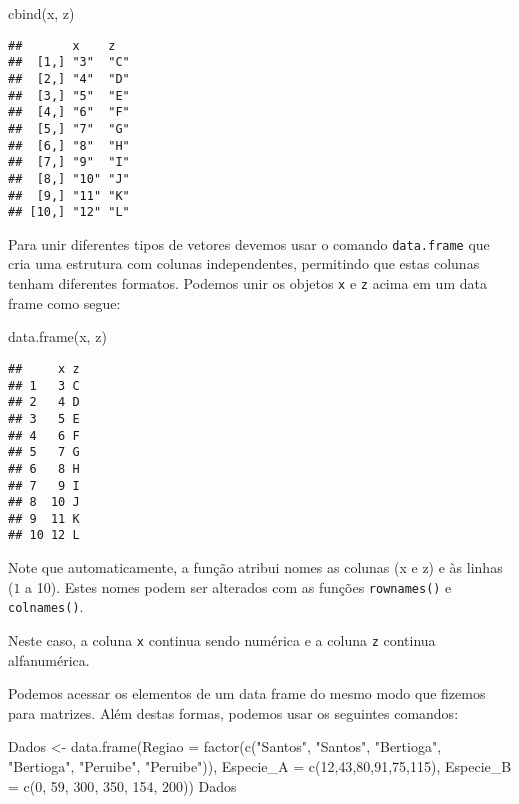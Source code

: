 \documentclass[
]{book}
\newenvironment{Shaded}{\begin{snugshade}}{\end{snugshade}}
\newcommand{\AttributeTok}[1]{\textcolor[rgb]{0.77,0.63,0.00}{#1}}
\newcommand{\DecValTok}[1]{\textcolor[rgb]{0.00,0.00,0.81}{#1}}
\newcommand{\FunctionTok}[1]{\textcolor[rgb]{0.00,0.00,0.00}{#1}}
\newcommand{\NormalTok}[1]{#1}
\newcommand{\OtherTok}[1]{\textcolor[rgb]{0.56,0.35,0.01}{#1}}
\newcommand{\StringTok}[1]{\textcolor[rgb]{0.31,0.60,0.02}{#1}}
\begin{document}
\begin{Shaded}
\begin{Highlighting}[]
\FunctionTok{cbind}\NormalTok{(x, z)}
\end{Highlighting}
\end{Shaded}

\begin{verbatim}
##       x    z  
##  [1,] "3"  "C"
##  [2,] "4"  "D"
##  [3,] "5"  "E"
##  [4,] "6"  "F"
##  [5,] "7"  "G"
##  [6,] "8"  "H"
##  [7,] "9"  "I"
##  [8,] "10" "J"
##  [9,] "11" "K"
## [10,] "12" "L"
\end{verbatim}

Para unir diferentes tipos de vetores devemos usar o comando \texttt{data.frame} que cria uma estrutura com colunas independentes, permitindo que estas colunas tenham diferentes formatos. Podemos unir os objetos \texttt{x} e \texttt{z} acima em um data frame como segue:

\begin{Shaded}
\begin{Highlighting}[]
\FunctionTok{data.frame}\NormalTok{(x, z)}
\end{Highlighting}
\end{Shaded}

\begin{verbatim}
##     x z
## 1   3 C
## 2   4 D
## 3   5 E
## 4   6 F
## 5   7 G
## 6   8 H
## 7   9 I
## 8  10 J
## 9  11 K
## 10 12 L
\end{verbatim}

Note que automaticamente, a função atribui nomes as colunas (x e z) e às linhas (\(1\) a 10). Estes nomes podem ser alterados com as funções \texttt{rownames()} e \texttt{colnames()}.

Neste caso, a coluna \texttt{x} continua sendo numérica e a coluna \texttt{z} continua alfanumérica.

Podemos acessar os elementos de um data frame do mesmo modo que fizemos para matrizes. Além destas formas, podemos usar os seguintes comandos:

\begin{Shaded}
\begin{Highlighting}[]
\NormalTok{Dados }\OtherTok{\textless{}{-}} \FunctionTok{data.frame}\NormalTok{(}\AttributeTok{Regiao =} \FunctionTok{factor}\NormalTok{(}\FunctionTok{c}\NormalTok{(}\StringTok{"Santos"}\NormalTok{, }\StringTok{"Santos"}\NormalTok{, }
                                     \StringTok{"Bertioga"}\NormalTok{, }\StringTok{"Bertioga"}\NormalTok{, }
                                     \StringTok{"Peruibe"}\NormalTok{, }\StringTok{"Peruibe"}\NormalTok{)),}
                   \AttributeTok{Especie\_A =} \FunctionTok{c}\NormalTok{(}\DecValTok{12}\NormalTok{,}\DecValTok{43}\NormalTok{,}\DecValTok{80}\NormalTok{,}\DecValTok{91}\NormalTok{,}\DecValTok{75}\NormalTok{,}\DecValTok{115}\NormalTok{), }
                   \AttributeTok{Especie\_B =} \FunctionTok{c}\NormalTok{(}\DecValTok{0}\NormalTok{, }\DecValTok{59}\NormalTok{, }\DecValTok{300}\NormalTok{, }\DecValTok{350}\NormalTok{, }\DecValTok{154}\NormalTok{, }\DecValTok{200}\NormalTok{))}
\NormalTok{Dados}
\end{Highlighting}
\end{Shaded}
\end{document}
